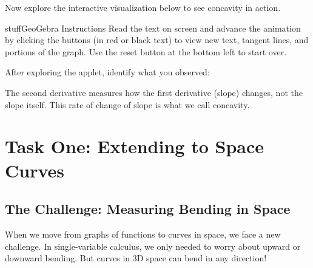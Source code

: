 \documentclass{ximera}
\begin{document}
\begin{problem}
Now explore the interactive visualization below to see concavity in action.

\begin{expandable}{stuff}{GeoGebra Instructions}
    Read the text on screen and advance the animation by clicking the buttons (in red or black text) to view new text, tangent lines, and portions of the graph. Use the reset button at the bottom left to start over.
\end{expandable}

\begin{center}
\end{center}

After exploring the applet, identify what you observed:
\begin{selectAll}
\end{selectAll}

\begin{feedback}
The second derivative measures how the first derivative (slope) changes, not the slope itself. This rate of change of slope is what we call concavity.
\end{feedback}
\end{problem}

\section*{Task One: Extending to Space Curves}

\subsection*{The Challenge: Measuring Bending in Space}

When we move from graphs of functions to curves in space, we face a new challenge. In single-variable calculus, we only needed to worry about upward or downward bending. But curves in 3D space can bend in any direction!
\end{document}
